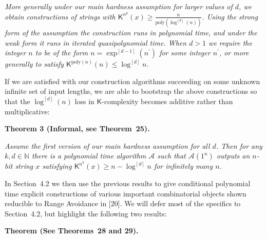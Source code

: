 \emph{More generally under our main hardness assumption for larger values of $d$, we obtain constructions of strings with ${\mathsf{K}}^{n^{k}}(x)\geq\frac{n}{\mathrm{poly}(\log^{[d]}(n))}$. Using the strong form of the assumption the construction runs in polynomial time, and under the weak form it runs in iterated quasipolynomial time. When $d>1$ we require the integer $n$ to be of the form $n=\exp^{[d-1]}(n^{\prime})$ for some integer $n^{\prime}$, or more generally to satisfy ${\mathsf{K}}^{\mathrm{poly}(n)}(n)\leq\log^{[d]}n$.}\par






If we are satisfied with our construction algorithms succeeding on some unknown infinite set of input lengths, we are able to bootstrap the above constructions so that the $\log^{[d]}(n)$ loss in ${\mathsf{K}}$-complexity becomes additive rather than multiplicative:\par





\par\medskip\noindent\textbf{
\textbf{Theorem 3}\textbf{ }(Informal, see Theorem 25)\textbf{.}
}\par



\emph{Assume the first version of our main hardness assumption for all $d$.
Then for any $k,d\in\mathbb{N}$ there is a polynomial time algorithm $\mathcal{A}$ such that $\mathcal{A}(1^{n})$ outputs an $n$-bit string $x$ satisfying ${\mathsf{K}}^{n^{k}}(x)\geq n-\log^{[d]}n$ for infinitely many $n$.}\par






In Section 4.2 we then use the previous results to give conditional polynomial time explicit constructions of various important combinatorial objects shown reducible to Range Avoidance in [20]. We will defer most of the specifics to Section 4.2, but highlight the following two results:\par





\par\medskip\noindent\textbf{
\textbf{Theorem}\textbf{ }(See Theorems 28 and 29)\textbf{.}
}\par



